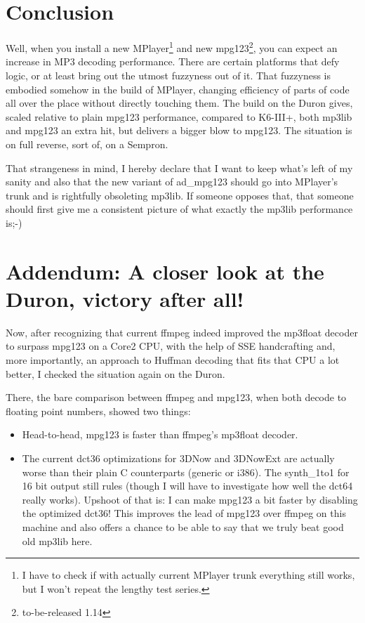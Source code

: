\documentclass[a4paper,12pt]{scrartcl}
\begin{document}
\section{Conclusion}

Well, when you install a new MPlayer\footnote{I have to check if with actually current MPlayer trunk everything still works, but I won't repeat the lengthy test series.} and new mpg123\footnote{to-be-released 1.14}, you can expect an increase in MP3 decoding performance.
There are certain platforms that defy logic, or at least bring out the utmost fuzzyness out of it. That fuzzyness is embodied somehow in the build of MPlayer, changing efficiency of parts of code all over the place without directly touching them.
The build on the Duron gives, scaled relative to plain mpg123 performance, compared to K6-III+, both mp3lib and mpg123 an extra hit, but delivers a bigger blow to mpg123. The situation is on full reverse, sort of, on a Sempron.

That strangeness in mind, I hereby declare that I want to keep what's left of my sanity and also that the new variant of ad\_mpg123 should go into MPlayer's trunk and is rightfully obsoleting mp3lib.
If someone opposes that, that someone should first give me a consistent picture of what exactly the mp3lib performance is;-)

\section{Addendum: A closer look at the Duron, victory after all!}

Now, after recognizing that current ffmpeg indeed improved the mp3float decoder to surpass mpg123 on a Core2 CPU, with the help of SSE handcrafting and, more importantly, an approach to Huffman decoding that fits that CPU a lot better,
I checked the situation again on the Duron.

There, the bare comparison between ffmpeg and mpg123, when both decode to floating point numbers, showed two things:
\begin{itemize}
\item Head-to-head, mpg123 is faster than ffmpeg's mp3float decoder.
\item The current dct36 optimizations for 3DNow and 3DNowExt are actually worse than their plain C counterparts (generic or i386). The synth\_1to1 for 16 bit output still rules (though I will have to investigate how well the dct64 really works). Upshoot of that is: I can make mpg123 a bit faster by disabling the optimized dct36!
This improves the lead of mpg123 over ffmpeg on this machine and also offers a chance to be able to say that we truly beat good old mp3lib here.
\end{itemize}
\end{document}
